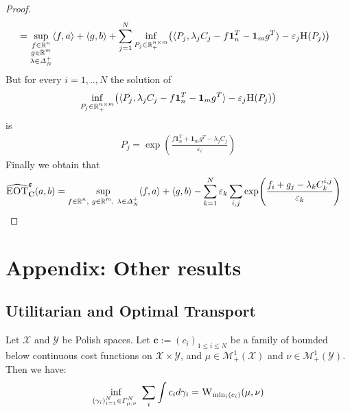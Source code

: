 \begin{proof}
\begin{align*}
    & = \sup\limits_{\substack{f\in\mathbb{R}^n\\g\in\mathbb{R}^m\\\lambda\in\Delta_N^{+}}} \langle f,a \rangle + \langle g, b \rangle + \sum_{j=1}^N\inf_{P_j\in\mathbb{R}_+^{n\times m}}\left(\langle P_j,\lambda_jC_j-f\mathbf{1}_n^T - \mathbf{1}_m g^T\rangle -\varepsilon_j \ent(P_j) \right)
\end{align*}
But for every $i=1,..,N$ the solution of 
\begin{align*}
    \inf_{P_j\in\mathbb{R}_+^{n\times m}}\left(\langle P_j,\lambda_jC_j-f\mathbf{1}_n^T - \mathbf{1}_m g^T\rangle -\varepsilon_j \ent(P_j)\right)
\end{align*}
is
\begin{align*}
  P_j = \exp\left(\frac{f\mathbf{1}_n^T + \mathbf{1}_m g^T-\lambda_j C_j}{\varepsilon_i}\right)
\end{align*}
Finally we obtain that
\begin{align*}
    \widehat{\MOT}^{\bm{\varepsilon}}_{\mathbf{C}}(a,b)
    &= \sup\limits_{\substack{f\in\mathbb{R}^n,~g\in\mathbb{R}^m,~\lambda\in\Delta_N^{+}}} \langle f,a \rangle + \langle g, b \rangle  - \sum_{k=1}^N \varepsilon_k \sum_{i,j} \exp\left(\frac{f_i+g_j-\lambda_k C_k^{i,j}}{\varepsilon_k}\right)
\end{align*}
\end{proof}



\newpage 
\section{Appendix: Other results}


\subsection{Utilitarian and Optimal Transport}
\label{res:min-sum}

\begin{prop}
Let $\mathcal{X}$ and $\mathcal{Y}$ be Polish spaces. Let $\mathbf{c}:=(c_i)_{1\leq i\leq N}$ be a family of bounded below continuous cost functions on $\mathcal{X}\times \mathcal{Y}$, and $\mu\in\mathcal{M}^1_+(\mathcal{X})$ and  $\nu\in\mathcal{M}^1_+(\mathcal{Y})$. Then we have:
\begin{align}
  \inf_{\substack{(\gamma_i)_{i=1}^N\in\Gamma^N_{\mu,\nu}\
}}  \sum_i \int c_i d\gamma_i = \textsc{W}_{\min_i(c_i)}(\mu,\nu)
\end{align}
\end{prop}


